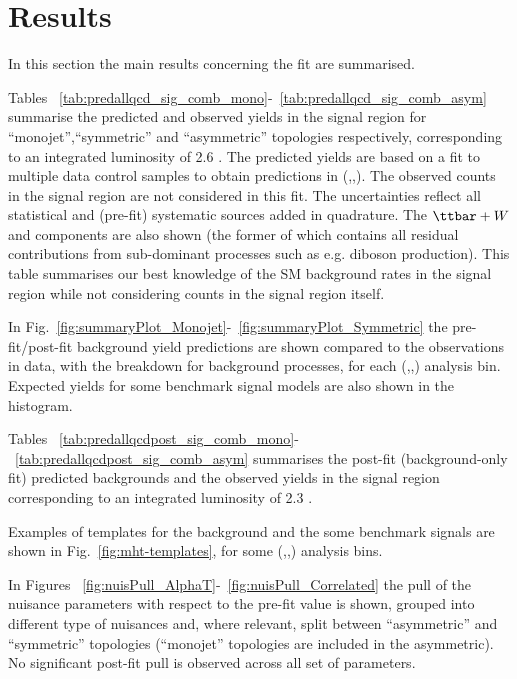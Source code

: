 \section{Results}
\label{sec:results}

In this section the main results concerning the fit are summarised. 

Tables ~\ref{tab:predallqcd_sig_comb_mono}-~\ref{tab:predallqcd_sig_comb_asym} summarise 
the predicted and observed yields in the signal region 
for ``monojet'',``symmetric'' and ``asymmetric'' topologies respectively, 
corresponding to an integrated luminosity of 2.6 \ifb.
The predicted yields are based on a fit to multiple data control samples to obtain predictions in (\nj,\nb,\scalht). 
The observed counts in the signal region are not considered in this fit. 
The uncertainties reflect all statistical and (pre-fit) systematic sources added in quadrature. 
The $\ttbar+W$ and \znunu components are also shown (the former of which contains all residual contributions from sub-dominant processes such as e.g. diboson production). 
This table summarises our best knowledge of the SM background rates in the signal region while not considering counts in the signal region itself. 

In Fig.~\ref{fig:summaryPlot_Monojet}-~\ref{fig:summaryPlot_Symmetric} the pre-fit/post-fit background yield predictions 
are shown compared to the observations in data, with the breakdown for background processes, for each (\njet,\nb,\scalht) analysis bin. 
Expected yields for some benchmark signal models are also shown in the histogram. 

Tables ~\ref{tab:predallqcdpost_sig_comb_mono}-~\ref{tab:predallqcdpost_sig_comb_asym} summarises the post-fit (background-only fit) predicted backgrounds and the 
observed yields in the signal region corresponding to an integrated luminosity of 2.3 \ifb. 

Examples of \mht templates for the background and the some benchmark signals are shown in Fig.~\ref{fig:mht-templates}, 
for some (\njet,\nb,\scalht) analysis bins. 

In Figures ~\ref{fig:nuisPull_AlphaT}-~\ref{fig:nuisPull_Correlated} the pull 
of the nuisance parameters with respect to the pre-fit value is shown, 
grouped into different type of nuisances and, where relevant, 
split between ``asymmetric'' and ``symmetric'' topologies 
(``monojet'' topologies are included in the asymmetric). \\
No significant post-fit pull is observed across all set of parameters. 

